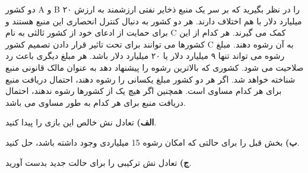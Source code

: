 دو کشور
A
و
B
را در نظر بگیرید که بر سر یک منبع ذخایر نفتی ارزشمند به ارزش ۲۰ میلیارد دلار با هم اختلاف دارند. هر دو کشور به دنبال کنترل انحصاری این منبع هستند و برای حمایت از ادعای خود از کشور ثالثی به نام
C
کمک می گیرند. هر کدام از این کشورها می توانند برای تحت تاثیر قرار دادن تصمیم کشور
C
به آن رشوه دهند. مبلغ رشوه می تواند تنها ۹ میلیارد دلار  یا ۲۰ میلیارد دلار باشد. هر مبلغ دیگری باعث رد صلاحیت می شود. کشوری که بالاترین رشوه را پیشنهاد دهد به عنوان مالک قانونی منبع شناخته خواهد شد. اگر هر دو کشور مبلغ یکسانی را رشوه دهند، احتمال دریافت منبع برای هر کدام مساوی است. همچنین اگر هیچ یک از کشورها رشوه ندهند، احتمال دریافت منبع برای هر کدام به طور مساوی می باشد.
\vspace{10pt}

\textbf{الف)}
تعادل نش خالص این بازی را پیدا کنید.
\vspace{5pt}

\textbf{ب)}
بخش قبل را برای حالتی که امکان رشوه 15 میلیاردی وجود داشته باشد، حل کنید.
\vspace{5pt}

\textbf{ج)}
تعادل نش ترکیبی را برای حالت جدید بدست آورید.